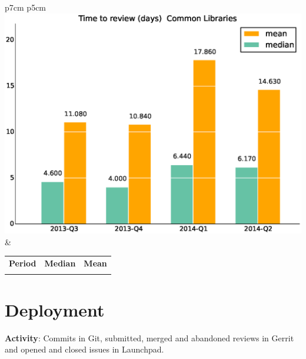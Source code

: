 \documentclass[a4wide,11pt]{report}
\begin{document}
\begin{tabular}{p{7cm} p{5cm}}
    \vspace{0pt} 
    \includegraphics[scale=.35]{figs/timetoreview_medianCommonLibraries.eps}
    & 
    \vspace{0pt}
    \begin{tabular}{l|r|r|}%
    \bfseries Period & \bfseries Median & \bfseries Mean %
    \csvreader[head to column names]{data/timetoreview_medianCommonLibraries.csv}{}%
    {\\ & \mediantime & \meantime}
    \end{tabular}
\end{tabular}

\newpage
\section{Deployment}

\textbf{Activity}: Commits in Git, submitted, merged and abandoned reviews in Gerrit and opened and closed issues in Launchpad.
\end{document}
